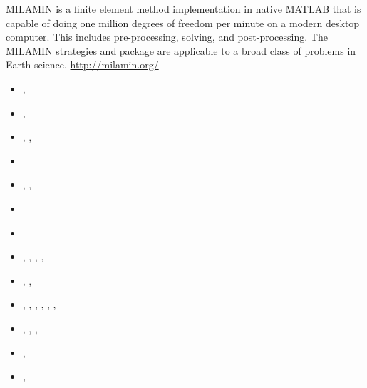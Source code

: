 MILAMIN is a finite element method implementation in native MATLAB that is capable 
of doing one million degrees of freedom per minute on a modern desktop computer. 
This includes pre-processing, solving, and post-processing. The MILAMIN strategies and 
package are applicable to a broad class of problems in Earth science. \url{http://milamin.org/}

\begin{small}
\begin{itemize}
\item[\twothousandeight]       \textcite{daks08},  \textcite{scdk08}
\item[\twothousandnine]        \textcite{gogk09},  \textcite{kalb09}
\item[\twothousandten]         \textcite{krda10},  \textcite{kaus10},  \textcite{dekc10}
\item[\twothousandeleven]      \textcite{yakm11}
\item[\twothousandtwelve]      \textcite{gebk12},  \textcite{rukb12},  \textcite{thka12}
\item[\twothousandthirteen]    \textcite{scpo13}
\item[\twothousandfourteen]    \textcite{jobk14}
\item[\twothousandfifteen]     \textcite{lukz15},  \textcite{gehm15},  \textcite{baka15}, 
                               \textcite{thkp15},  \textcite{musd15}
\item[\twothousandsixteen]     \textcite{jads16},  \textcite{maka16},  \textcite{cakp16}
\item[\twothousandeighteen]    \textcite{dusd18},  \textcite{jasc18},  \textcite{jadg18},
                               \textcite{comj18},  \textcite{jens18},  \textcite{rabw18},
                               \textcite{chsm18}
\item[\twothousandnineteen]    \textcite{sifg19},  \textcite{baba19},  \textcite{sogh19},  
                               \textcite{anpa19}
\item[\twothousandtwenty]      \textcite{hube20},  \textcite{peaa20}
\item[\twothousandtwentythree] \textcite{lilm23},  \textcite{rapa23} 
\end{itemize}
\end{small}



